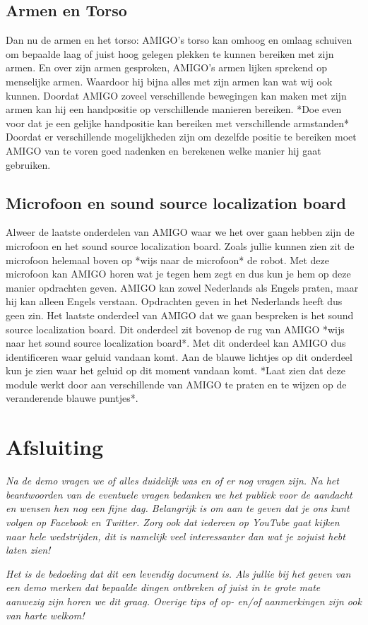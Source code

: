\documentclass[a4paper,10pt]{article}
\numberwithin{equation}{section}
\numberwithin{figure}{section}
\numberwithin{table}{section}
\begin{document}
\subsection*{Armen en Torso}
Dan nu de armen en het torso: AMIGO's torso kan omhoog en omlaag schuiven om bepaalde laag of juist hoog gelegen plekken te kunnen bereiken met zijn armen. En over zijn armen gesproken, AMIGO's armen lijken sprekend op menselijke armen. Waardoor hij bijna alles met zijn armen kan wat wij ook kunnen. Doordat AMIGO zoveel verschillende bewegingen kan maken met zijn armen kan hij een handpositie op verschillende manieren bereiken. *Doe even voor dat je een gelijke handpositie kan bereiken met verschillende armstanden* Doordat er verschillende mogelijkheden zijn om dezelfde positie te bereiken moet AMIGO van te voren goed nadenken en berekenen welke manier hij gaat gebruiken.
 
\subsection*{Microfoon en sound source localization board} 
Alweer de laatste onderdelen van AMIGO waar we het over gaan hebben zijn de microfoon en het sound source localization board. Zoals jullie kunnen zien zit de microfoon helemaal boven op *wijs naar de microfoon* de robot. Met deze microfoon kan AMIGO horen wat je tegen hem zegt en dus kun je hem op deze manier opdrachten geven.  AMIGO kan zowel Nederlands als Engels praten, maar hij kan alleen Engels verstaan. Opdrachten geven in het Nederlands heeft dus geen zin. Het laatste onderdeel van AMIGO dat we gaan bespreken is het sound source localization board. Dit onderdeel zit bovenop de rug van AMIGO *wijs naar het sound source localization board*. Met dit onderdeel kan AMIGO dus identificeren waar geluid vandaan komt. Aan de blauwe lichtjes op dit onderdeel kun je zien waar het geluid op dit moment vandaan komt. *Laat zien dat deze module werkt door aan verschillende van AMIGO te praten en te wijzen op de veranderende blauwe puntjes*. 

\section*{Afsluiting}
\textit{Na de demo vragen we of alles duidelijk was en of er nog vragen zijn. Na het beantwoorden van de eventuele vragen bedanken we het publiek voor de aandacht en wensen hen nog een fijne dag. Belangrijk is om aan te geven dat je ons kunt volgen op Facebook en Twitter. Zorg ook dat iedereen op YouTube gaat kijken naar hele wedstrijden, dit is namelijk veel interessanter dan wat je zojuist hebt laten zien!}

\textit{Het is de bedoeling dat dit een levendig document is. Als jullie bij het geven van een demo merken dat bepaalde dingen ontbreken of juist in te grote mate aanwezig zijn horen we dit graag. Overige tips of op- en/of aanmerkingen zijn ook van harte welkom! }
\end{document}
